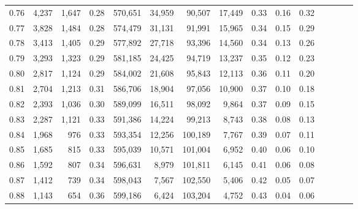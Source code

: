 \begin{tabular}{rrrcrrrrrrrrrrr}
0.76 &   4,237 &  1,647 &                                       0.28 &  570,651 &   34,959 &   90,507 &   17,449 &  0.33 &  0.16 &                         0.32 \\
0.77 &   3,828 &  1,484 &                                       0.28 &  574,479 &   31,131 &   91,991 &   15,965 &  0.34 &  0.15 &                         0.29 \\
0.78 &   3,413 &  1,405 &                                       0.29 &  577,892 &   27,718 &   93,396 &   14,560 &  0.34 &  0.13 &                         0.26 \\
0.79 &   3,293 &  1,323 &                                       0.29 &  581,185 &   24,425 &   94,719 &   13,237 &  0.35 &  0.12 &                         0.23 \\
0.80 &   2,817 &  1,124 &                                       0.29 &  584,002 &   21,608 &   95,843 &   12,113 &  0.36 &  0.11 &                         0.20 \\
0.81 &   2,704 &  1,213 &                                       0.31 &  586,706 &   18,904 &   97,056 &   10,900 &  0.37 &  0.10 &                         0.18 \\
0.82 &   2,393 &  1,036 &                                       0.30 &  589,099 &   16,511 &   98,092 &    9,864 &  0.37 &  0.09 &                         0.15 \\
0.83 &   2,287 &  1,121 &                                       0.33 &  591,386 &   14,224 &   99,213 &    8,743 &  0.38 &  0.08 &                         0.13 \\
0.84 &   1,968 &    976 &                                       0.33 &  593,354 &   12,256 &  100,189 &    7,767 &  0.39 &  0.07 &                         0.11 \\
0.85 &   1,685 &    815 &                                       0.33 &  595,039 &   10,571 &  101,004 &    6,952 &  0.40 &  0.06 &                         0.10 \\
0.86 &   1,592 &    807 &                                       0.34 &  596,631 &    8,979 &  101,811 &    6,145 &  0.41 &  0.06 &                         0.08 \\
0.87 &   1,412 &    739 &                                       0.34 &  598,043 &    7,567 &  102,550 &    5,406 &  0.42 &  0.05 &                         0.07 \\
0.88 &   1,143 &    654 &                                       0.36 &  599,186 &    6,424 &  103,204 &    4,752 &  0.43 &  0.04 &                         0.06 \\

\end{tabular}
